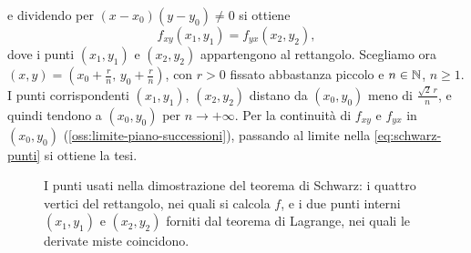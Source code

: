 \begin{dimostrazione}
e dividendo per $(x-x_{0})(y-y_{0})\neq0$ si ottiene
\begin{equation}\label{eq:schwarz-punti}
  f_{xy}(x_{1},y_{1})=f_{yx}(x_{2},y_{2}),
\end{equation}
dove i punti $(x_{1},y_{1})$ e $(x_{2},y_{2})$ appartengono al rettangolo. Scegliamo ora
$(x,y)=(x_{0}+\frac rn,\,y_{0}+\frac rn)$, con $r>0$ fissato abbastanza piccolo e
$n\in\mathbb{N}$, $n\ge1$. I punti corrispondenti $(x_{1},y_{1})$, $(x_{2},y_{2})$ distano da
$(x_{0},y_{0})$ meno di $\frac{\sqrt2\,r}{n}$, e quindi tendono a $(x_{0},y_{0})$ per
$n\to+\infty$. Per la continuità di $f_{xy}$ e $f_{yx}$ in $(x_{0},y_{0})$
(\cref{oss:limite-piano-successioni}), passando al limite nella \eqref{eq:schwarz-punti}
si ottiene la tesi.
\end{dimostrazione}

\begin{figure}[htb]
\centering
{}
\caption{I punti usati nella dimostrazione del teorema di Schwarz: i quattro vertici del
rettangolo, nei quali si calcola $f$, e i due punti interni $(x_{1},y_{1})$ e
$(x_{2},y_{2})$ forniti dal teorema di Lagrange, nei quali le derivate miste coincidono.}
\label{fig:schwarz}
\end{figure}

